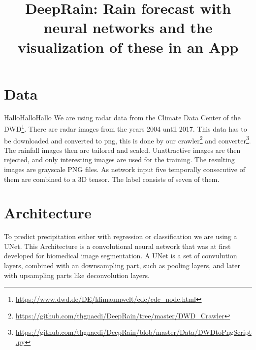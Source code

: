 \documentclass[oneside]{htwg-report}
\begin{document}



\newcommand{\verfasserA}{Simon Christofzik}
\newcommand{\verfasserB}{Paul Sutter}
\newcommand{\verfasserC}{Till Reitlinger}
\newcommand{\thema}{DeepRain: Rain forecast with neural networks and the visualization of these in an App}
\newcommand{\hoschschule}{Hochschule für Technik, Wirtschaft und Gestaltung}
\newcommand{\institut}{HTWG Konstanz, Institut für Optische Systeme}
\newcommand{\prueferA}{Oliver Dürr}


\title[Teamprojektthema]{\thema}


\makecover[]


\twocolumn
\section*{Data}
HalloHalloHallo
We are using radar data from the Climate Data Center of the DWD\footnote{\url{https://www.dwd.de/DE/klimaumwelt/cdc/cdc_node.html}}. There are radar images from the years 2004 until 2017.
This data has to be downloaded and converted to png, this is done by our crawler\footnote{\url{https://github.com/thgnaedi/DeepRain/tree/master/DWD_Crawler}} and converter\footnote{\url{https://github.com/thgnaedi/DeepRain/blob/master/Data/DWDtoPngScript.py}}.
The rainfall images then are tailored and scaled. Unattractive images are then rejected, and only interesting images are used for the training.
The resulting images are grayscale PNG files. As network input five temporally consecutive of them are combined to a 3D tensor. The label consists of seven of them.

\section*{Architecture}
To predict precipitation either with regression or classification we are using a UNet.
This Architecture is a convolutional neural network that was at first developed for biomedical image segmentation.
A UNet is a set of convulution layers, combined with an downsampling part, such as pooling layers, and later with upsampling parts like deconvolution layers.
\end{document}
